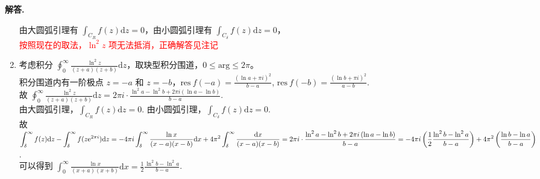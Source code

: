 \documentclass[11pt]{ctexart}
\newenvironment{solution}{\par\noindent\textbf{解答. }}{\par}
\begin{document}
\begin{solution}
\begin{enumerate}[(1)]
              由大圆弧引理有 $\displaystyle\int_{C_R}f(z)\text{d}z = 0$，由小圆弧引理有 $\displaystyle\int_{C_\delta}f(z)\text{d}z = 0$， \\[12pt]
              \textcolor{red}{按照现在的取法，$\ln^2{z}$ 项无法抵消，正确解答见注记}
        \item 考虑积分 $\displaystyle\oint_{0}^{\infty}\frac{\ln^2{z}}{(z+a)(z+b)}\text{d}z$，取玦型积分围道，$0\leq\text{arg}\leq2\pi$。 \\[12pt]
              积分围道内有一阶极点 $z = -a$ 和 $z = -b$，$\displaystyle\text{res}\ f(-a) = \frac{\left(\ln{a}+\pi i\right)^2}{b-a}$,
              $\displaystyle\text{res}\ f(-b) = \frac{\left(\ln{b}+\pi i\right)^2}{a-b}$. \\[12pt]
              故 $\displaystyle\oint_{0}^{\infty}\frac{\ln^2{z}}{(z+a)(z+b)}\text{d}z 
              = 2\pi i\cdot\frac{\ln^2{a}-\ln^2{b}+2\pi i\left(\ln{a}-\ln{b}\right)}{b-a}$. \\[12pt]
              由大圆弧引理，$\displaystyle\int_{C_R}f(z)\text{d}z = 0$. \quad
              由小圆弧引理，$\displaystyle\int_{C_{\delta}}f(z)\text{d}z = 0$. \\[12pt]
              故 $\displaystyle\int_{\delta}^{\infty}f(z)\text{d}z - \int_{\delta}^{\infty}f(z\text{e}^{2\pi i})\text{d}z
              = -4\pi i\int_{\delta}^{\infty}\frac{\ln{x}}{(x-a)(x-b)}\text{d}x 
              + 4\pi^2\int_{\delta}^{\infty}\frac{\text{d}x}{(x-a)(x-b)} \\[12pt]
              = 2\pi i\cdot\frac{\ln^2{a}-\ln^2{b}+2\pi i\left(\ln{a}-\ln{b}\right)}{b-a}
              = -4\pi i\left(\frac{1}{2}\frac{\ln^2{b}-\ln^2{a}}{b-a}\right)
              + 4\pi^2\left(\frac{\ln{b}-\ln{a}}{b-a}\right)$. \\[12pt]
              可以得到 $\displaystyle\int_{0}^{\infty}\frac{\ln{x}}{(x+a)(x+b)}\text{d}x
              = \frac{1}{2}\frac{\ln^2{b}-\ln^2{a}}{b-a}$.
    \end{enumerate}
\end{solution}
\end{document}
